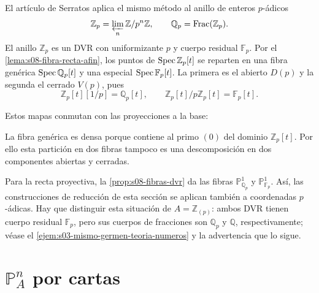 \begin{ejem}
\label{ejem:s08-fibras-p-adicas}
El artículo de Serratos \cite[\S\S2.1 y 3.1]{serratos2023} aplica el mismo método al anillo de enteros $p$-ádicos
\[
\mathbb Z_p=\varprojlim_n\mathbb Z/p^n\mathbb Z,\qquad
\mathbb Q_p=\operatorname{Frac}(\mathbb Z_p).
\]
El anillo $\mathbb Z_p$ es un DVR con uniformizante $p$ y cuerpo residual $\mathbb F_p$. Por el \cref{lema:s08-fibra-recta-afin}, los puntos de $\operatorname{Spec}\mathbb Z_p[t]$ se reparten en una fibra genérica $\operatorname{Spec}\mathbb Q_p[t]$ y una especial $\operatorname{Spec}\mathbb F_p[t]$. La primera es el abierto $D(p)$ y la segunda el cerrado $V(p)$, pues
\[
\mathbb Z_p[t][1/p]=\mathbb Q_p[t],\qquad
\mathbb Z_p[t]/p\mathbb Z_p[t]=\mathbb F_p[t].
\]
\par\noindent\begin{minipage}{\linewidth}
Estos mapas conmutan con las proyecciones a la base:
\begin{center}
\end{center}
\end{minipage}\par
La fibra genérica es densa porque contiene al primo $(0)$ del dominio $\mathbb Z_p[t]$. Por ello esta partición en dos fibras tampoco es una descomposición en dos componentes abiertas y cerradas.

Para la recta proyectiva, la \cref{prop:s08-fibras-dvr} da las fibras $\mathbb P_{\mathbb Q_p}^1$ y $\mathbb P_{\mathbb F_p}^1$. Así, las construcciones de reducción de esta sección se aplican también a coordenadas $p$-ádicas. Hay que distinguir esta situación de $A=\mathbb Z_{(p)}$: ambos DVR tienen cuerpo residual $\mathbb F_p$, pero sus cuerpos de fracciones son $\mathbb Q_p$ y $\mathbb Q$, respectivamente; véase el \cref{ejem:s03-mismo-germen-teoria-numeros} y la advertencia que lo sigue.
\end{ejem}

\section{\texorpdfstring{$\mathbb P_A^n$}{PnA} por cartas}

